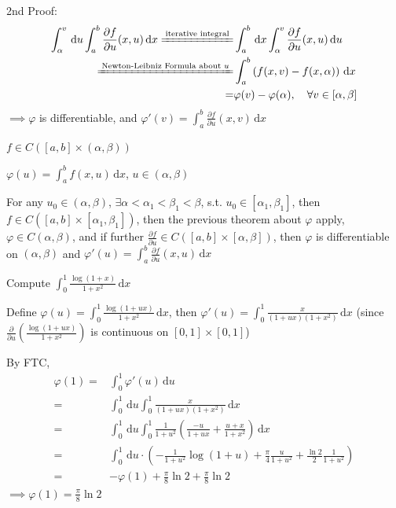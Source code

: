 2nd Proof:
\begin{align*}
    \int_{\alpha}^v\,\mathrm{d}u\int_a^b\frac{\partial f}{\partial u}(x,u)\,\mathrm{d}x\xlongequal{\text{iterative integral}} & \int_a^b\,\mathrm{d}x\int_{\alpha}^v\frac{\partial f}{\partial u}(x,u)\,\mathrm{d}u \\
    \xlongequal{\text{Newton-Leibniz Formula about }u}                                                                        & \int_a^b\left(f(x,v)-f(x,\alpha)\right)\,\mathrm{d}x                                \\
    =                                                                                                                         & \varphi(v)-\varphi(\alpha),\quad\forall v\in[\alpha,\beta]
\end{align*}
$\implies\varphi$ is differentiable, and $\varphi'(v)=\int_a^b\frac{\partial f}{\partial u}(x,v)\,\mathrm{d}x$

$f\in C\left([a,b]\times(\alpha,\beta)\right)$

$\varphi(u)=\int_a^b f(x,u)\,\mathrm{d}x$, $u\in(\alpha,\beta)$

For any $u_0\in(\alpha,\beta)$, $\exists\alpha<\alpha_1<\beta_1<\beta$, s.t. $u_0\in[\alpha_1,\beta_1]$, then $f\in C\left([a,b]\times[\alpha_1,\beta_1]\right)$, then the previous theorem about $\varphi$ apply, $\varphi\in C(\alpha,\beta)$, and if further $\frac{\partial f}{\partial u}\in C\left([a,b]\times[\alpha,\beta]\right)$, then $\varphi$ is differentiable on $(\alpha,\beta)$ and $\varphi'(u)=\int_a^b\frac{\partial f}{\partial u}(x,u)\,\mathrm{d}x$

\begin{example}
    Compute $\int_0^1\frac{\log(1+x)}{1+x^2}\,\mathrm{d}x$

    Define $\varphi(u)=\int_0^1\frac{\log(1+ux)}{1+x^2}\,\mathrm{d}x$, then $\varphi'(u)=\int_0^1\frac{x}{(1+ux)(1+x^2)}\,\mathrm{d}x$ (since $\frac{\partial}{\partial u}\left(\frac{\log(1+ux)}{1+x^2}\right)$ is continuous on $[0,1]\times[0,1]$)

    By FTC,
    \begin{align*}
        \varphi(1)= & \int_0^1\varphi'(u)\,\mathrm{d}u                                                                                             \\
        =           & \int_0^1\,\mathrm{d}u\int_0^1\frac{x}{(1+ux)(1+x^2)}\,\mathrm{d}x                                                            \\
        =           & \int_0^1\,\mathrm{d}u\int_0^1\frac{1}{1+u^2}\left(\frac{-u}{1+ux}+\frac{u+x}{1+x^2}\right)\,\mathrm{d}x                      \\
        =           & \int_0^1\,\mathrm{d}u\cdot\left(-\frac{1}{1+u^2}\log(1+u)+\frac{\pi}{4}\frac{u}{1+u^2}+\frac{\ln 2}{2}\frac{1}{1+u^2}\right) \\
        =           & -\varphi(1)+\frac{\pi}{8}\ln 2+\frac{\pi}{8}\ln 2
    \end{align*}
    $\implies\varphi(1)=\frac{\pi}{8}\ln 2$
\end{example}

